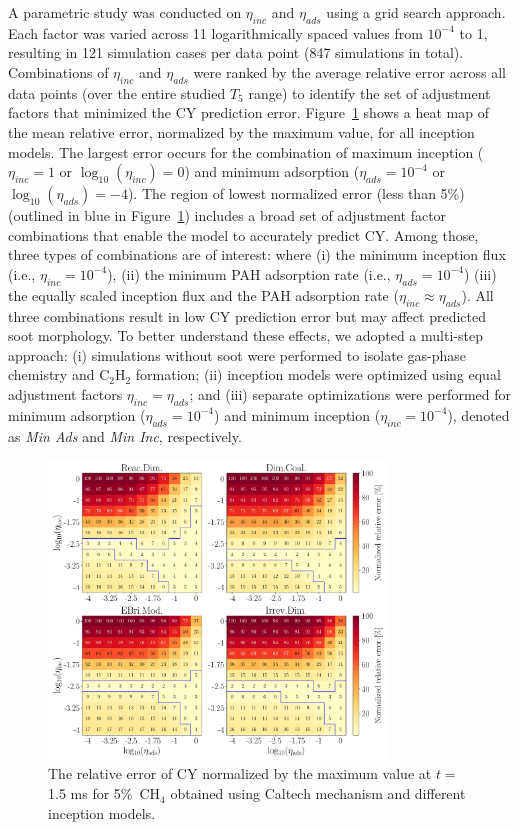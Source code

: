 A parametric study was conducted on $\eta_{inc}$ and $\eta_{ads}$ using a grid search approach. Each factor was varied across 11 logarithmically spaced values from $10^{-4}$ to 1, resulting in 121 simulation cases per data point (847 simulations in total). Combinations of $\eta_{inc}$ and $\eta_{ads}$ were ranked by the average relative error across all data points (over the entire studied $T_5$ range) to identify the set of adjustment factors that minimized the CY prediction error. Figure~\ref{fig:shockagof_yielderror_cpr} shows a heat map of the mean relative error, normalized by the maximum value, for all inception models. The largest error occurs for the combination of maximum inception ($\eta_{inc} = 1$ or $\log_{10}(\eta_{inc}) = 0$) and minimum adsorption ($\eta_{ads} = 10^{-4}$ or $\log_{10}(\eta_{ads}) = -4$). The region of lowest normalized error (less than 5\%) (outlined in blue in Figure~\ref{fig:shockagof_yielderror_cpr}) includes a broad set of adjustment factor combinations that enable the model to accurately predict CY. Among those, three types of combinations are of interest: where (i) the minimum inception flux (i.e., $\eta_{inc} = 10^{-4}$), (ii) the minimum PAH adsorption rate (i.e., $\eta_{ads} = 10^{-4}$) (iii) the equally scaled inception flux and the PAH adsorption rate  ($\eta_{inc}\approx\eta_{ads}$). All three combinations result in low CY prediction error but may affect predicted soot morphology. To better understand these effects, we adopted a multi-step approach: (i) simulations without soot were performed to isolate gas-phase chemistry and $\mathrm{C_2H_2}$ formation; (ii) inception models were optimized using equal adjustment factors $\eta_{inc} = \eta_{ads}$; and (iii) separate optimizations were performed for minimum adsorption ($\eta_{ads} = 10^{-4}$) and minimum inception ($\eta_{inc} = 10^{-4}$), denoted as \textit{Min Ads} and \textit{Min Inc}, respectively.

\begin{figure}[H]
	\centering
	\includegraphics[width=0.8\textwidth]{Figures/Results/Shocktube/Agafonov2016_cpr/5CH4_norm_yield_error_all.pdf}
	\caption{The relative error of CY normalized by the maximum value at $t=$1.5 ms for 5\%~$\mathrm{CH_4}$ obtained using Caltech mechanism and different inception models.}
	\label{fig:shockagof_yielderror_cpr} 
\end{figure}


